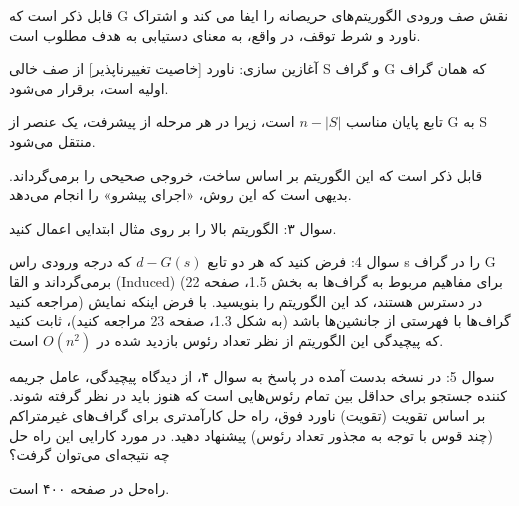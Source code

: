 \documentclass{book} %
\begin{document}
قابل ذکر است که G نقش صف ورودی الگوریتم‌های حریصانه را ایفا می کند و اشتراک ناورد و
شرط توقف، در واقع، به معنای دستیابی به هدف مطلوب است.

آغازین سازی: ناورد [خاصیت تغییرناپذیر] از صف خالی S
و گراف G که همان گراف اولیه است، برقرار می‌شود.

تابع پایان مناسب $n−|S|$ است، زیرا در هر مرحله از پیشرفت، یک عنصر از G به S منتقل می‌شود.

قابل ذکر است که این الگوریتم بر اساس ساخت، خروجی صحیحی را برمی‌گرداند. بدیهی است که این روش، «اجرای پیشرو» را انجام می‌دهد.

سوال ۳: الگوریتم بالا را بر روی مثال ابتدایی اعمال کنید.


سوال 4: فرض کنید که هر دو تابع $d−G(s)$ که درجه ورودی راس s را در گراف G برمی‌گرداند
و القا (Induced) (برای مفاهیم مربوط به گراف‌ها به بخش 1.5، صفحه 22 مراجعه کنید) در دسترس هستند،
کد این الگوریتم را بنویسید. با فرض اینکه نمایش گراف‌ها با فهرستی از جانشین‌ها باشد
(به شکل 1.3، صفحه 23 مراجعه کنید)، ثابت کنید که پیچیدگی این الگوریتم از نظر تعداد رئوس بازدید شده
در $O(n^2)$ است.

سوال 5: در نسخه بدست آمده در پاسخ به سوال ۴، از دیدگاه پیچیدگی، عامل جریمه کننده
جستجو برای حداقل بین تمام رئوس‌هایی است که هنوز باید در نظر گرفته شوند. بر اساس تقویت (تقویت) ناورد فوق، راه حل کارآمدتری برای گراف‌های غیرمتراکم (چند قوس با توجه به مجذور تعداد رئوس) پیشنهاد دهید. در مورد کارایی
این راه حل چه نتیجه‌ای می‌توان گرفت؟

راه‌حل در صفحه ۴۰۰ است.
\end{document}

